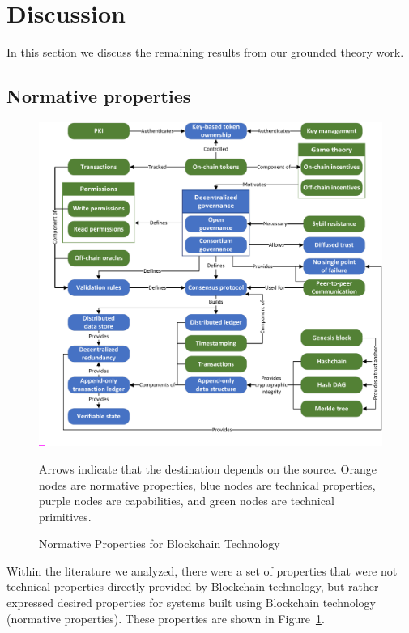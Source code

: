 
\section{Discussion}
In this section we discuss the remaining results from our grounded theory work.

\subsection{Normative properties}
\label{sec:normative}

\begin{figure}
	\centering
	\includegraphics[page=3,width=\columnwidth]{figures/grounded-theory-main}
	
	Arrows indicate that the destination depends on the source. Orange nodes are normative properties, blue nodes are technical properties, purple nodes are capabilities, and green nodes are technical primitives.
	\caption{Normative Properties for Blockchain Technology}
	\label{fig:normative-properties}
\end{figure}

Within the literature we analyzed, there were a set of properties that were not technical properties directly provided by Blockchain technology, but rather expressed desired properties for systems built using Blockchain technology (\ie normative properties).
These properties are shown in Figure~\ref{fig:normative-properties}.

